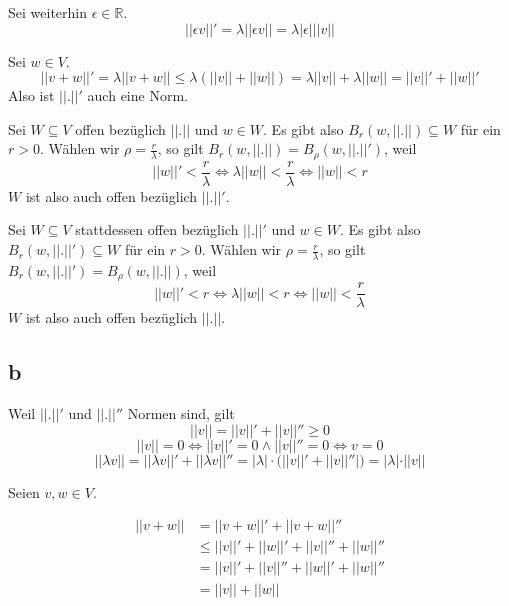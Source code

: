 \documentclass[10pt,a4paper]{article}
\begin{document}
Sei weiterhin $\epsilon \in \mathbb{R}$.
\begin{equation}
||\epsilon v||' = \lambda ||\epsilon v|| = \lambda |\epsilon| ||v||
\end{equation}

Sei $w \in V$.
\begin{equation}
||v + w||' = \lambda ||v + w|| \le \lambda (||v|| + ||w||) = \lambda ||v|| + \lambda ||w|| = ||v||' + ||w||'
\end{equation}
Also ist $||.||'$ auch eine Norm.

Sei $W \subseteq V$ offen bezüglich $||.||$ und $w \in W$.
Es gibt also $B_{r}(w, ||.||) \subseteq W$ für ein $r > 0$.
Wählen wir $\rho = \frac{r}{\lambda}$, so gilt $B_{r}(w, ||.||) = B_{\rho}(w, ||.||')$, weil
\begin{equation}
||w||' < \frac{r}{\lambda} \Leftrightarrow \lambda ||w|| < \frac{r}{\lambda} \Leftrightarrow ||w|| < r
\end{equation}
$W$ ist also auch offen bezüglich $||.||'$.

Sei $W \subseteq V$ stattdessen offen bezüglich $||.||'$ und $w \in W$.
Es gibt also $B_{r}(w, ||.||') \subseteq W$ für ein $r > 0$.
Wählen wir $\rho = \frac{r}{\lambda}$, so gilt $B_{r}(w, ||.||') = B_{\rho}(w, ||.||)$, weil
\begin{equation}
||w||' < r \Leftrightarrow \lambda ||w|| < r \Leftrightarrow ||w|| < \frac{r}{\lambda}
\end{equation}
$W$ ist also auch offen bezüglich $||.||$.

\subsection*{b}

Weil $||.||'$ und $||.||''$ Normen sind, gilt
\begin{equation}
||v|| = ||v||' + ||v||'' \ge 0
\end{equation}
\begin{equation}
||v|| = 0 \Leftrightarrow ||v||' = 0 \land ||v||'' = 0 \Leftrightarrow v = 0
\end{equation}
\begin{equation}
||\lambda v|| = ||\lambda v||' + ||\lambda v||'' = |\lambda| \cdot (||v||' + ||v||''|) = |\lambda| \cdot ||v||
\end{equation}

Seien $v, w \in V$.

\begin{align}
||v + w||&  = ||v + w||' + ||v + w||''\\
& \le ||v||' + ||w||' + ||v||'' + ||w||''\\
& = ||v||' + ||v||'' + ||w||' + ||w||''\\
& = ||v|| + ||w||
\end{align}
\end{document}
